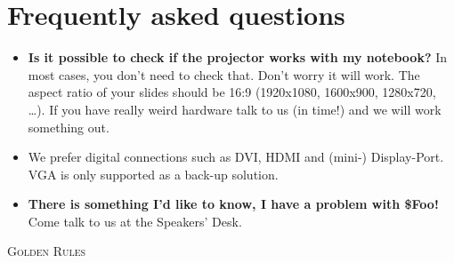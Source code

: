 \documentclass[paper=a4]{scrartcl}
\begin{document}
	\section*{Frequently asked questions}
	\begin{itemize}
		\item \textbf{Is it possible to check if the projector works with my notebook?} In most cases, you don't need to check that. Don't worry it will work. The aspect ratio of your slides should be 16:9 (1920x1080, 1600x900, 1280x720, \ldots). If you have really weird hardware talk to us (in time!) and we will work something out.
		\item We prefer digital connections such as DVI, HDMI and (mini-) Display-Port. VGA is only supported as a back-up solution. 
		\item \textbf{There is something I'd like to know, I have a problem with \$Foo!} Come talk to us at the Speakers' Desk.
	\end{itemize}
\newpage
\begin{center} \textsc{\Huge Golden Rules}\end{center}
\end{document}

